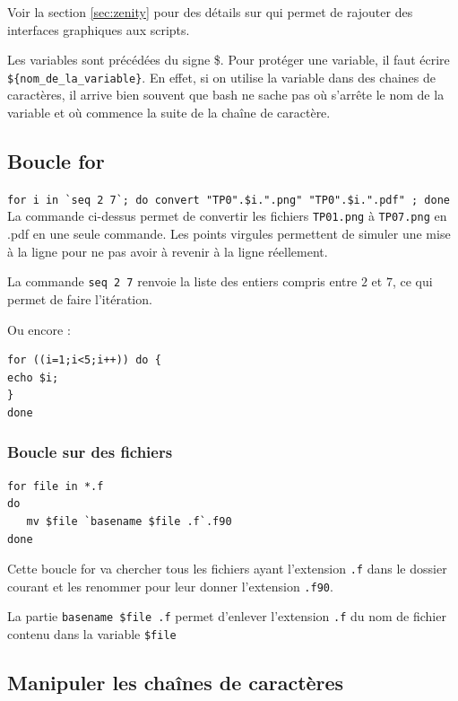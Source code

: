 \documentclass[a4paper,twoside]{article}
\begin{document}
Voir la section \ref{sec:zenity} pour des détails sur  qui permet de rajouter des interfaces graphiques aux scripts.

Les variables sont précédées du signe \$. Pour \og protéger \fg une variable, il faut écrire \\ \verb|${nom_de_la_variable}|. En effet, si on utilise la variable dans des chaines de caractères, il arrive bien souvent que bash ne sache pas où s'arrête le nom de la variable et où commence la suite de la chaîne de caractère.

\subsection{Boucle for}
\verb|for i in `seq 2 7`; do convert "TP0".$i.".png" "TP0".$i.".pdf" ; done|\\
La commande ci-dessus permet de convertir les fichiers \texttt{TP01.png} à \texttt{TP07.png} en .pdf en une seule commande. Les points virgules permettent de simuler une mise à la ligne pour ne pas avoir à revenir à la ligne réellement.

La commande \texttt{seq 2 7} renvoie la liste des entiers compris entre $2$ et $7$, ce qui permet de faire l'itération.

Ou encore :

\begin{exemple}
\begin{verbatim}
for ((i=1;i<5;i++)) do {
echo $i;
}
done
\end{verbatim}
\end{exemple}

\subsubsection{Boucle sur des fichiers}
\begin{verbatim}
for file in *.f
do
   mv $file `basename $file .f`.f90
done
\end{verbatim}

Cette boucle for va chercher tous les fichiers ayant l'extension \texttt{.f} dans le dossier courant et les renommer pour leur donner l'extension \texttt{.f90}.

\begin{remarque}
La partie \verb|basename $file .f| permet d'enlever l'extension \texttt{.f} du nom de fichier contenu dans la variable \verb|$file|
\end{remarque}


\subsection{Manipuler les chaînes de caractères}
\end{document}
